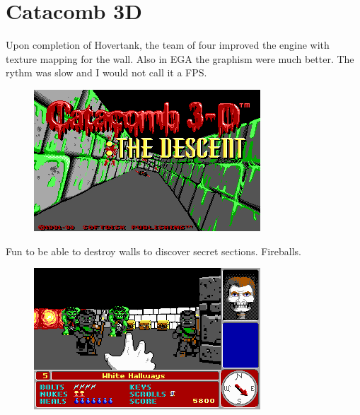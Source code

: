 \section{Catacomb 3D}
Upon completion of Hovertank, the team of four improved the engine with texture mapping for the wall. Also in EGA the graphism were much better. The rythm was slow and I would not call it a FPS. 
\begin{figure}[H]
\centering
\includegraphics[width=\textwidth]{imgs/Catacomb_3-D_The_Descent_title_screen.png}
\end{figure}

Fun to be able to destroy walls to discover secret sections. Fireballs.

\begin{figure}[H]
\centering
\includegraphics[width=\textwidth]{imgs/Catacomb_3-D_The_Descent_screenshot.png}
\end{figure}




